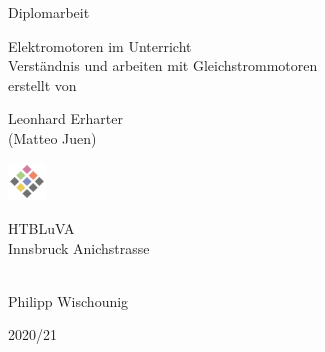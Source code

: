 \begin{titlepage}
	\begin{center}
		\Large{Diplomarbeit} \\
		
		\bigskip
		\bigskip
		\bigskip

		\Huge{Elektromotoren im Unterricht} \\
		\bigskip
		\bigskip
		\bigskip
		\huge{Verständnis und arbeiten mit Gleichstrommotoren} \\

		\bigskip
		\bigskip
		\bigskip
		\large{erstellt von} \\

		\bigskip
		\bigskip
		\bigskip
		
		\Huge{Leonhard Erharter} \\
		\Huge{(Matteo Juen)} \\
		\bigskip
		\bigskip
		\bigskip

		
		\bigskip
	    \bigskip
        
        \includegraphics[width=1cm]{../images/htl-logo}

		\Large{HTBLuVA} \\
		\Large{Innsbruck Anichstrasse} \\

		\bigskip		
		\bigskip
		\bigskip

		 \\
		Philipp Wischounig

		\bigskip
		\bigskip
		\bigskip
		\bigskip
		
		\Large{2020/21}

	\end{center}
 
\end{titlepage}